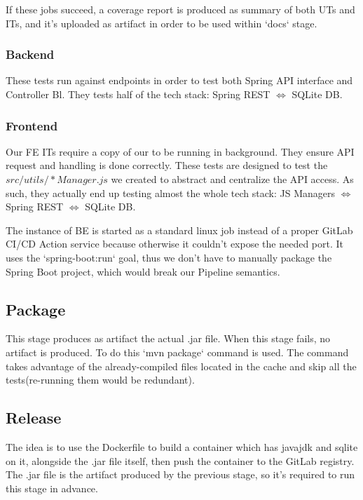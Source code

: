 \documentclass[a4paper,10pt]{scrartcl}
\begin{document}
If these jobs succeed, a coverage report is produced as summary of both UTs and ITs, and it's uploaded as artifact in order to be used within `docs` stage.

\subsubsection{Backend}

These tests run against endpoints in order to test both Spring API interface and Controller Bl. They tests half of the tech stack: Spring REST $\Leftrightarrow$ SQLite DB.

\subsubsection{Frontend}

Our FE ITs require a copy of our to be running in background. They ensure API request and handling is done correctly. These tests are designed to test the $src/utils/*Manager.js$ we created to abstract and centralize the API access. As such, they actually end up testing almost the whole tech stack: JS Managers $\Leftrightarrow$ Spring REST $\Leftrightarrow$ SQLite DB.

The instance of BE is started as a standard linux job instead of a proper GitLab CI/CD Action service because otherwise it couldn't expose the needed port. It uses the `spring-boot:run` goal, thus we don't have to manually package the Spring Boot project, which would break our Pipeline semantics.

\subsection{Package}

This stage produces as artifact the actual .jar file. When this stage fails, no artifact is produced.
To do this `mvn package` command is used. The command takes advantage of the already-compiled files located in the cache and skip all the tests(re-running them would be redundant).

\subsection{Release}

The idea is to use the Dockerfile to build a container which has javajdk and sqlite on it, alongside the .jar file itself, then push the container to the GitLab registry. The .jar file is the artifact produced by the previous stage, so it's required to run this stage in advance.
\end{document}
